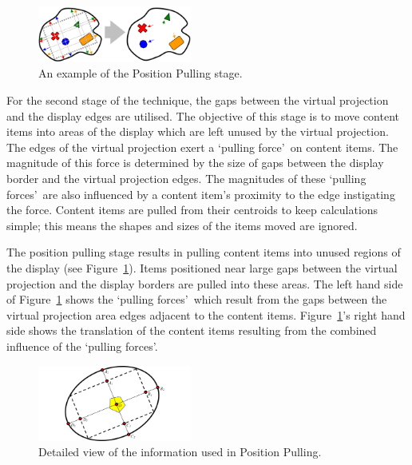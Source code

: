 \documentclass[review,5p,times,twocolumn]{elsarticle}
\begin{document}
\begin{figure}[h] 
 \centering
   \includegraphics[width=0.45\textwidth]{figures/virtual_rectangle_pull_example.png}
   \caption{An example of the Position Pulling stage.}
   \label{fig:pullLayout}
\end{figure}

For the second stage of the technique, the gaps between the virtual projection and the display edges are utilised.
The objective of this stage is to move content items into areas of the display which are left unused by the virtual projection.
The edges of the virtual projection exert a \lq pulling force\rq\ on content items.
The magnitude of this force is determined by the size of gaps between the display border and the virtual projection edges.
The magnitudes of these \lq pulling forces\rq\ are also influenced by a content item's proximity to the edge instigating the force.
Content items are pulled from their centroids to keep calculations simple; this means the shapes and sizes of the items moved are ignored.

The position pulling stage results in pulling content items into unused regions of the display (see
Figure~\ref{fig:pullLayout}).
Items positioned near large gaps between the virtual projection and the display borders are pulled into these areas.
The left hand side of Figure~\ref{fig:pullLayout} shows the \lq pulling forces\rq\ which result from the gaps between the virtual projection area edges adjacent to the content items.
Figure~\ref{fig:pullLayout}'s right hand side shows the translation of the content items resulting from the combined influence of the \lq pulling forces\rq .

\begin{figure}[h] 
 \centering
   \includegraphics[width=0.45\textwidth]{figures/virtual_rectangle_pull_example_detailed.png}
   \caption{Detailed view of the information used in Position Pulling.}
   \label{fig:pullLayoutExp}
\end{figure}
\end{document}
